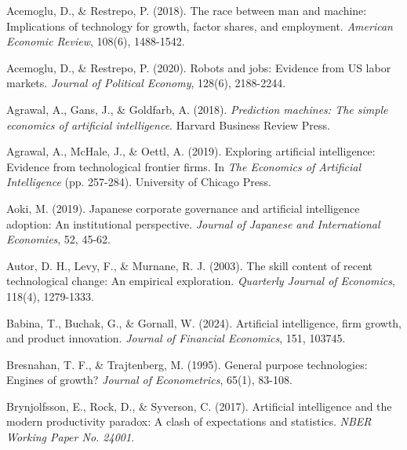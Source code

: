 \documentclass[12pt, a4paper]{article}
\begin{document}

\begin{thebibliography}{99}
Acemoglu, D., \& Restrepo, P. (2018). The race between man and machine: Implications of technology for growth, factor shares, and employment. \textit{American Economic Review}, 108(6), 1488-1542.

Acemoglu, D., \& Restrepo, P. (2020). Robots and jobs: Evidence from US labor markets. \textit{Journal of Political Economy}, 128(6), 2188-2244.

Agrawal, A., Gans, J., \& Goldfarb, A. (2018). \textit{Prediction machines: The simple economics of artificial intelligence}. Harvard Business Review Press.

Agrawal, A., McHale, J., \& Oettl, A. (2019). Exploring artificial intelligence: Evidence from technological frontier firms. In \textit{The Economics of Artificial Intelligence} (pp. 257-284). University of Chicago Press.

Aoki, M. (2019). Japanese corporate governance and artificial intelligence adoption: An institutional perspective. \textit{Journal of Japanese and International Economies}, 52, 45-62.

Autor, D. H., Levy, F., \& Murnane, R. J. (2003). The skill content of recent technological change: An empirical exploration. \textit{Quarterly Journal of Economics}, 118(4), 1279-1333.

Babina, T., Buchak, G., \& Gornall, W. (2024). Artificial intelligence, firm growth, and product innovation. \textit{Journal of Financial Economics}, 151, 103745.

Bresnahan, T. F., \& Trajtenberg, M. (1995). General purpose technologies: Engines of growth? \textit{Journal of Econometrics}, 65(1), 83-108.

Brynjolfsson, E., Rock, D., \& Syverson, C. (2017). Artificial intelligence and the modern productivity paradox: A clash of expectations and statistics. \textit{NBER Working Paper No. 24001}.


\end{thebibliography}
\end{document}
